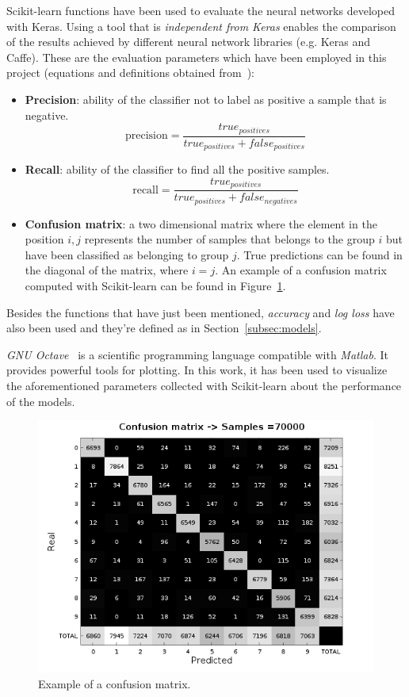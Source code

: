 Scikit-learn functions have been used to evaluate the neural networks developed with Keras. Using a tool that is \emph{independent from Keras} enables the comparison of the results achieved by different neural network libraries (e.g. Keras and Caffe). These are the evaluation parameters which have been employed in this project (equations and definitions obtained from~\cite{scikit-doc}):
\begin{itemize}
	\item \textbf{Precision}: ability of the classifier not to label as positive a sample that is negative.
	\begin{equation}\label{eq:precision}
	\textrm{precision}=\frac{true_{positives}}{true_{positives}+false_{positives}}
	\end{equation}
	
	\item \textbf{Recall}: ability of the classifier to find all the positive samples.
	\begin{equation}\label{eq:recall}
	\textrm{recall}=\frac{true_{positives}}{true_{positives}+false_{negatives}}
	\end{equation}
	
	\item \textbf{Confusion matrix}: a two dimensional matrix where the element in the position $i,j$ represents the number of samples that belongs to the group $i$ but have been classified as belonging to group $j$. True predictions can be found in the diagonal of the matrix, where $i=j$. An example of a confusion matrix computed with Scikit-learn can be found in Figure~\ref{fig:conf_mat}.
\end{itemize}

Besides the functions that have just been mentioned, \emph{accuracy} and \emph{log loss} have also been used and they're defined as in Section~\ref{subsec:models}.

\emph{GNU Octave}~\cite{octave} is a scientific programming language compatible with \emph{Matlab}. It provides powerful tools for plotting. In this work, it has been used to visualize the aforementioned parameters collected with Scikit-learn about the performance of the models.

\begin{figure}
	\centering
	\includegraphics[width=0.8\linewidth, keepaspectratio]{figures/conf_mat.png}
	\caption{Example of a confusion matrix.}
	\label{fig:conf_mat}
\end{figure}

